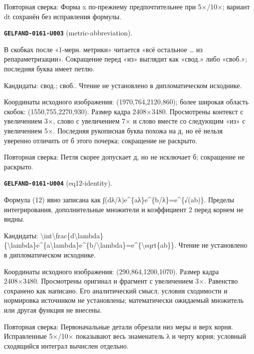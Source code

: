 Повторная сверка: Форма x по-прежнему предпочтительнее при 5×/10×; вариант dt сохранён без исправления формулы.\par\medskip
\par\noindent\leavevmode{}\label{GELFAND-0161-U003}\label{GELFAND-P001485:metric-abbreviation}\textbf{\texttt{GELFAND-0161-U003}} (metric-abbreviation).\nopagebreak[4]\par
В скобках после «1-мерн. метрики» читается «всё остальное … из репараметризации». Сокращение перед «из» выглядит как «свод.» либо «своб.»; последняя буква имеет петлю.\par
Кандидаты: свод.; своб.. Чтение не установлено в дипломатическом исходнике.\par
Координаты исходного изображения: (1970,764,2120,860); более широкая область скобок: (1550,755,2270,930). Размер кадра 2408×3480. Просмотрены контекст с увеличением 3×, слово с увеличением 7× и слово вместе со следующим «из» с увеличением 5×. Последняя рукописная буква похожа на д, но её нельзя уверенно отличить от б этого почерка; сокращение не раскрыто.\par
Повторная сверка: Петля скорее допускает д, но не исключает б; сокращение не раскрыто.\par\medskip
\par\noindent\leavevmode{}\label{GELFAND-0161-U004}\label{GELFAND-P001485:eq12-identity}\textbf{\texttt{GELFAND-0161-U004}} (eq12-identity).\nopagebreak[4]\par
Формула (12) явно записана как ∫(dλ/λ)e\textasciicircum{}\{aλ\}e\textasciicircum{}\{b/λ\}=e\textasciicircum{}\{√(ab)\}. Пределы интегрирования, дополнительные множители и коэффициент 2 перед корнем не видны.\par
Кандидаты: \textbackslash{}int\textbackslash{}frac\{d\textbackslash{}lambda\}\{\textbackslash{}lambda\}e\textasciicircum{}\{a\textbackslash{}lambda\}e\textasciicircum{}\{b/\textbackslash{}lambda\}=e\textasciicircum{}\{\textbackslash{}sqrt\{ab\}\}. Чтение не установлено в дипломатическом исходнике.\par
Координаты исходного изображения: (290,864,1200,1070). Размер кадра 2408×3480. Просмотрены оригинал и фрагмент с увеличением 3×. Равенство сохранено как написано. Его аналитический смысл, условия сходимости и нормировка источником не установлены; математически ожидаемый множитель или другая функция не внесены.\par
Повторная сверка: Первоначальные детали обрезали низ меры и верх корня. Исправленные 5×/10× показывают весь знаменатель λ и черту корня; условный сходящийся интеграл вычислен отдельно.\par\medskip
